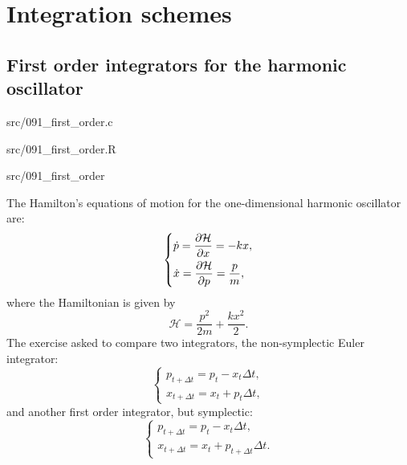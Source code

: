 \chapter{Integration schemes}

\section{First order integrators for the harmonic oscillator}

\begin{sourcefiles}
  \item[Source code] src/091\_first\_order.c
  \item[Analysis script] src/091\_first\_order.R
  \item[Executable] src/091\_first\_order
\end{sourcefiles}

The Hamilton’s equations of motion for the one-dimensional harmonic oscillator
are:
\begin{equation}
  \begin{dcases}
    \dot{p} = \pdiff{\mathcal{H}}{x} = - kx, \\
    \dot{x} = \pdiff{\mathcal{H}}{p} = \frac{p}{m},
  \end{dcases}
\end{equation}
where the Hamiltonian is given by
\begin{equation}
  \mathcal{H} = \frac{p^{2}}{2m} + \frac{kx^{2}}{2}.
  \label{eq:harm-osc-H}
\end{equation}
The exercise asked to compare two integrators, the non-symplectic Euler
integrator:
\begin{equation}
  \begin{cases}
    p_{t + \Delta t} = p_{t} - x_{t} \Delta t, \\
    x_{t + \Delta t} = x_{t} + p_{t} \Delta t,
  \end{cases}
  \label{eq:non-symp}
\end{equation}
and another first order integrator, but symplectic:
\begin{equation}
  \begin{cases}
    p_{t + \Delta t} = p_{t} - x_{t} \Delta t, \\
    x_{t + \Delta t} = x_{t} + p_{t + \Delta t} \Delta t.
  \end{cases}
  \label{eq:symp}
\end{equation}

